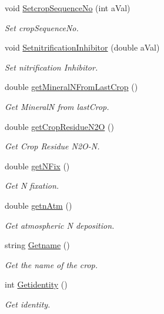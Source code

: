 \begin{DoxyCompactItemize}
void \mbox{\hyperlink{class_crop_class_aa9fd67d026734124a666d33b3f7268c4}{Setcrop\+Sequence\+No}} (int a\+Val)
\begin{DoxyCompactList}\small\item\em Set crop\+Sequence\+No. \end{DoxyCompactList}\item 
void \mbox{\hyperlink{class_crop_class_a0178d9141992bca14d294e72061aa314}{Setnitrification\+Inhibitor}} (double a\+Val)
\begin{DoxyCompactList}\small\item\em Set nitrification Inhibitor. \end{DoxyCompactList}\item 
double \mbox{\hyperlink{class_crop_class_ab935be3bbe7d14e94d8be7446e2eec5c}{get\+Mineral\+N\+From\+Last\+Crop}} ()
\begin{DoxyCompactList}\small\item\em Get MineralN from last\+Crop. \end{DoxyCompactList}\item 
double \mbox{\hyperlink{class_crop_class_a824ec8a36e0a25214ff061191e629417}{get\+Crop\+Residue\+N2O}} ()
\begin{DoxyCompactList}\small\item\em Get Crop Residue N2\+O-\/N. \end{DoxyCompactList}\item 
double \mbox{\hyperlink{class_crop_class_a47aa8037798f19366b41912f45007df4}{get\+N\+Fix}} ()
\begin{DoxyCompactList}\small\item\em Get N fixation. \end{DoxyCompactList}\item 
double \mbox{\hyperlink{class_crop_class_a917149eeb182c83f27ca4d028a660204}{getn\+Atm}} ()
\begin{DoxyCompactList}\small\item\em Get atmospheric N deposition. \end{DoxyCompactList}\item 
string \mbox{\hyperlink{class_crop_class_a84905f5c6057de9d1eb2c1b6ff29d69d}{Getname}} ()
\begin{DoxyCompactList}\small\item\em Get the name of the crop. \end{DoxyCompactList}\item 
int \mbox{\hyperlink{class_crop_class_afd387abad6de080d8a058b014a8dc6f0}{Getidentity}} ()
\begin{DoxyCompactList}\small\item\em Get identity. \end{DoxyCompactList}\item 

\end{DoxyCompactItemize}
